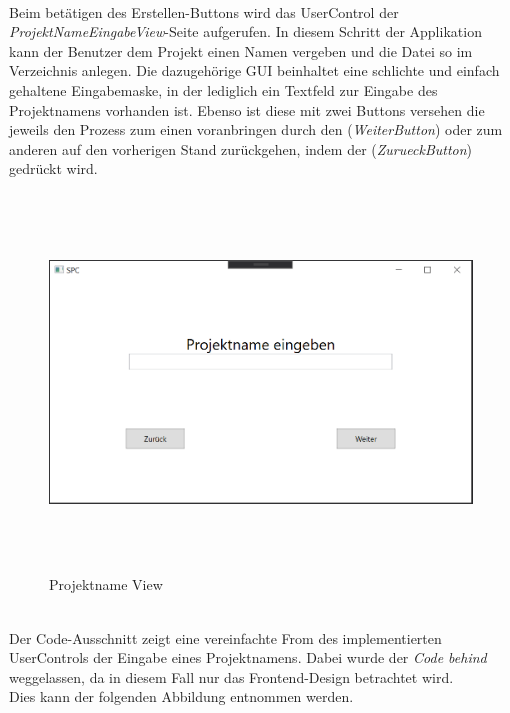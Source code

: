 \pagebreak
\\Beim betätigen des Erstellen-Buttons wird das UserControl der \textit{ProjektNameEingabeView}-Seite aufgerufen. In diesem Schritt der 
Applikation kann der Benutzer dem Projekt einen Namen vergeben und die Datei so im Verzeichnis anlegen. Die dazugehörige GUI beinhaltet eine 
schlichte und einfach gehaltene Eingabemaske, in der lediglich ein Textfeld zur Eingabe des Projektnamens vorhanden ist. Ebenso ist diese mit zwei Buttons versehen die jeweils 
den Prozess zum einen voranbringen durch den (\textit{WeiterButton}) oder zum anderen auf den vorherigen Stand zurückgehen, indem der (\textit{ZurueckButton}) gedrückt wird.
\\
\linebreak
\begin{figure}[htb!]
    \centering
    \includegraphics[width=15cm,height=10cm,keepaspectratio]{5Implementierungen/Bilder/ProjektNameEingabeView.png}
    \caption{Projektname View}
\end{figure} 
\pagebreak 
\\Der Code-Ausschnitt zeigt eine vereinfachte From des implementierten UserControls der Eingabe eines Projektnamens. Dabei wurde der \textit{Code behind} weggelassen, da 
in diesem Fall nur das Frontend-Design betrachtet wird. 
\\Dies kann der folgenden Abbildung entnommen werden.
\\
